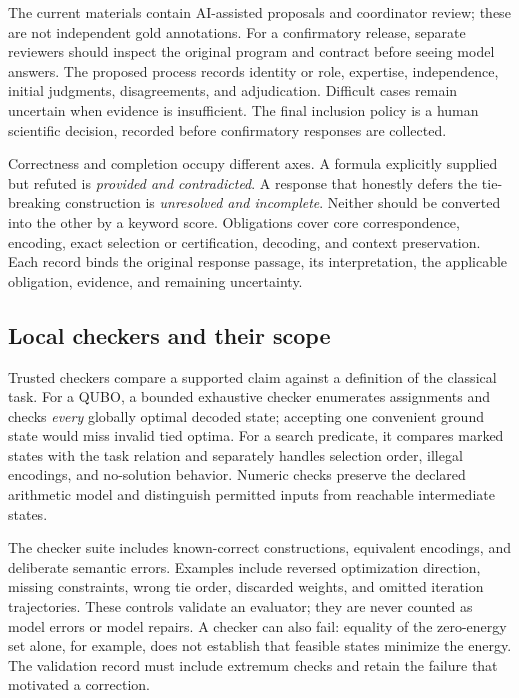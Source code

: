 The current materials contain AI-assisted proposals and coordinator review;
these are not independent gold annotations. For a confirmatory release, separate
reviewers should inspect the original program and contract before seeing model
answers. The proposed process records identity or role, expertise, independence,
initial judgments, disagreements, and adjudication. Difficult cases remain
uncertain when evidence is insufficient. The final inclusion policy is a human
scientific decision, recorded before confirmatory responses are collected.

Correctness and completion occupy different axes. A formula explicitly supplied
but refuted is \emph{provided and contradicted}. A response that honestly defers
the tie-breaking construction is \emph{unresolved and incomplete}. Neither should
be converted into the other by a keyword score. Obligations cover core
correspondence, encoding, exact selection or certification, decoding, and context
preservation. Each record binds the original response passage, its interpretation,
the applicable obligation, evidence, and remaining uncertainty.

\subsection{Local checkers and their scope}
Trusted checkers compare a supported claim against a definition of the classical
task. For a QUBO, a bounded exhaustive checker enumerates assignments and checks
\emph{every} globally optimal decoded state; accepting one convenient ground
state would miss invalid tied optima. For a search predicate, it compares marked
states with the task relation and separately handles selection order, illegal
encodings, and no-solution behavior. Numeric checks preserve the declared
arithmetic model and distinguish permitted inputs from reachable intermediate
states.

The checker suite includes known-correct constructions, equivalent encodings,
and deliberate semantic errors. Examples include reversed optimization direction,
missing constraints, wrong tie order, discarded weights, and omitted iteration
trajectories. These controls validate an evaluator; they are never counted as
model errors or model repairs. A checker can also fail: equality of the zero-energy
set alone, for example, does not establish that feasible states minimize the
energy. The validation record must include extremum checks and retain the failure
that motivated a correction.

